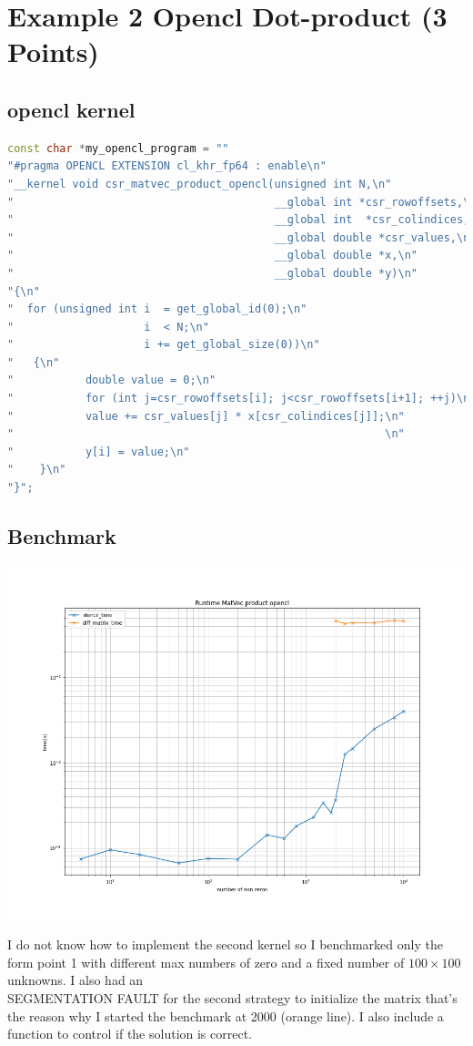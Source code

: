 \documentclass[11pt,a4paper]{article}
\begin{document}
\section*{Example 2 Opencl Dot-product (3 Points)}
\subsection*{opencl kernel}
\begin{lstlisting}[language=C++, caption={kernel for sparce matrix prod}]
const char *my_opencl_program = ""
"#pragma OPENCL EXTENSION cl_khr_fp64 : enable\n"    
"__kernel void csr_matvec_product_opencl(unsigned int N,\n"
"                                        __global int *csr_rowoffsets,\n"
"                                        __global int  *csr_colindices,\n"
"                                        __global double *csr_values,\n"
"                                        __global double *x,\n"
"                                        __global double *y)\n"
"{\n"
"  for (unsigned int i  = get_global_id(0);\n"
"                    i  < N;\n"
"                    i += get_global_size(0))\n"
"   {\n"
"           double value = 0;\n"
"           for (int j=csr_rowoffsets[i]; j<csr_rowoffsets[i+1]; ++j)\n"
"           value += csr_values[j] * x[csr_colindices[j]];\n"
"                                                         \n"
"           y[i] = value;\n"
"    }\n"
"}";
\end{lstlisting}
\subsection*{Benchmark}	
\begin{center}
	\begin{minipage}[t]{0.49\textwidth}
		\includegraphics[width=\textwidth]{Bilder/Runtime_MatVec_product_opencl}
	\end{minipage}
\end{center}
\noindent
I do not know how to implement the second kernel so I benchmarked only the form point 1 with different max numbers of zero and a fixed number of $100 \times 100$ unknowns. I also had an\\ SEGMENTATION FAULT for the second strategy to initialize the matrix that's the reason why I started the benchmark at 2000 (orange line). I also include a function to control if the solution is correct.
\end{document}
